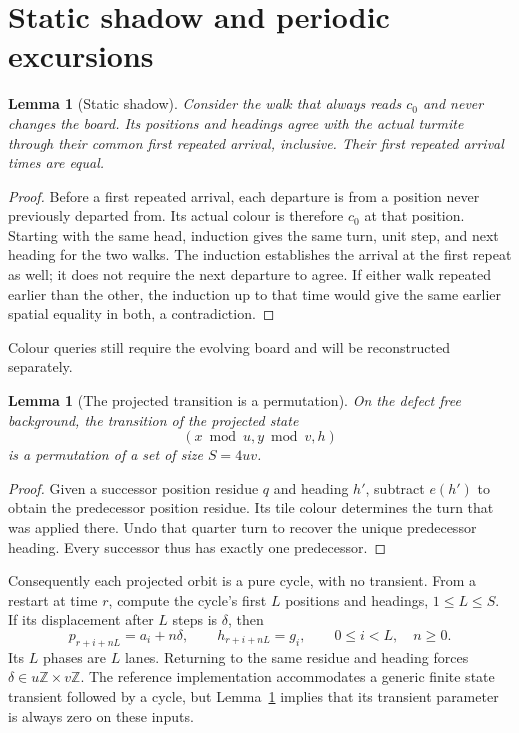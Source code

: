 \documentclass[11pt,letterpaper]{article}
\newtheorem{lemma}[theorem]{Lemma}
\theoremstyle{definition}\newtheorem{definition}[theorem]{Definition}
\theoremstyle{remark}\newtheorem{remark}[theorem]{Remark}
\newcommand{\Z}{\mathbb Z}\newcommand{\N}{\mathbb N}\newcommand{\Zp}{\mathbb Z_{>0}}
\begin{document}
\section{Static shadow and periodic excursions}\label{ptr:sec:shadow}
\begin{lemma}[Static shadow]\label{ptr:lem:shadow}
Consider the walk that always reads $c_0$ and never changes the board. Its positions and headings agree with the actual turmite through their common first repeated arrival, inclusive. Their first repeated arrival times are equal.
\end{lemma}
\begin{proof}
Before a first repeated arrival, each departure is from a position never previously departed from. Its actual colour is therefore $c_0$ at that position. Starting with the same head, induction gives the same turn, unit step, and next heading for the two walks. The induction establishes the arrival at the first repeat as well; it does not require the next departure to agree. If either walk repeated earlier than the other, the induction up to that time would give the same earlier spatial equality in both, a contradiction.
\end{proof}
Colour queries still require the evolving board and will be reconstructed separately.

\begin{lemma}[The projected transition is a permutation]\label{ptr:lem:permutation}
On the defect free background, the transition of the projected state
\[
 (x\bmod u,y\bmod v,h)
\]
is a permutation of a set of size $S=4uv$.
\end{lemma}
\begin{proof}
Given a successor position residue $q$ and heading $h'$, subtract $e(h')$ to obtain the predecessor position residue. Its tile colour determines the turn that was applied there. Undo that quarter turn to recover the unique predecessor heading. Every successor thus has exactly one predecessor.
\end{proof}
Consequently each projected orbit is a pure cycle, with no transient. From a restart at time $r$, compute the cycle's first $L$ positions and headings, $1\le L\le S$. If its displacement after $L$ steps is $\delta$, then
\begin{equation}\label{ptr:eq:excursion}
 p_{r+i+nL}=a_i+n\delta,\qquad h_{r+i+nL}=g_i,
 \qquad 0\le i<L,\quad n\ge0.
\end{equation}
Its $L$ phases are $L$ lanes. Returning to the same residue and heading forces $\delta\in u\Z\times v\Z$. The reference implementation accommodates a generic finite state transient followed by a cycle, but Lemma~\ref{ptr:lem:permutation} implies that its transient parameter is always zero on these inputs.
\end{document}
